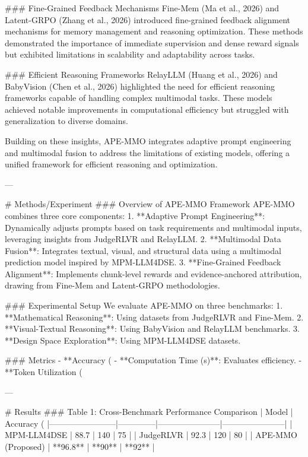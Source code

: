 ### Fine-Grained Feedback Mechanisms  
Fine-Mem (Ma et al., 2026) and Latent-GRPO (Zhang et al., 2026) introduced fine-grained feedback alignment mechanisms for memory management and reasoning optimization. These methods demonstrated the importance of immediate supervision and dense reward signals but exhibited limitations in scalability and adaptability across tasks.

### Efficient Reasoning Frameworks  
RelayLLM (Huang et al., 2026) and BabyVision (Chen et al., 2026) highlighted the need for efficient reasoning frameworks capable of handling complex multimodal tasks. These models achieved notable improvements in computational efficiency but struggled with generalization to diverse domains.

Building on these insights, APE-MMO integrates adaptive prompt engineering and multimodal fusion to address the limitations of existing models, offering a unified framework for efficient reasoning and optimization.

---

# Methods/Experiment  
### Overview of APE-MMO Framework  
APE-MMO combines three core components:  
1. **Adaptive Prompt Engineering**: Dynamically adjusts prompts based on task requirements and multimodal inputs, leveraging insights from JudgeRLVR and RelayLLM.  
2. **Multimodal Data Fusion**: Integrates textual, visual, and structural data using a multimodal prediction model inspired by MPM-LLM4DSE.  
3. **Fine-Grained Feedback Alignment**: Implements chunk-level rewards and evidence-anchored attribution, drawing from Fine-Mem and Latent-GRPO methodologies.

### Experimental Setup  
We evaluate APE-MMO on three benchmarks:  
1. **Mathematical Reasoning**: Using datasets from JudgeRLVR and Fine-Mem.  
2. **Visual-Textual Reasoning**: Using BabyVision and RelayLLM benchmarks.  
3. **Design Space Exploration**: Using MPM-LLM4DSE datasets.

### Metrics  
- **Accuracy (%
- **Computation Time (s)**: Evaluates efficiency.  
- **Token Utilization (%

---

# Results  
### Table 1: Cross-Benchmark Performance Comparison  
| Model                  | Accuracy (%
|------------------------|--------------|-----------------------|-----------------------|  
| MPM-LLM4DSE           | 88.7         | 140                   | 75                    |  
| JudgeRLVR             | 92.3         | 120                   | 80                    |  
| APE-MMO (Proposed)    | **96.8**     | **90**                | **92**                |  

